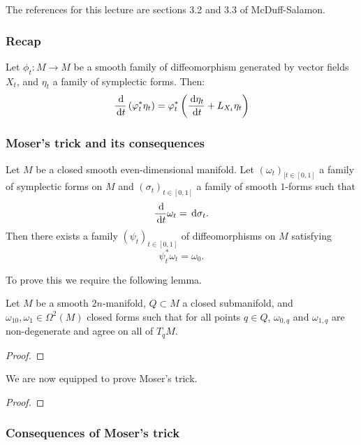 The references for this lecture are sections 3.2 and 3.3 of McDuff-Salamon.
\subsubsection*{Recap}


\begin{thm*}
    Let $\phi_t:M\to M$ be a smooth family of diffeomorphism generated by vector fields $X_t$, and $\eta_t$ a family of symplectic forms.
    Then:
    \[\frac{\,\mathrm d}{\,\mathrm d t}\left(\varphi_t^*\eta_t\right)=\varphi_t^*\left(\frac{\,\mathrm d\eta_t}{\,\mathrm d t}+L_{X_t}\eta_t\right)\]
\end{thm*}

\subsubsection*{Moser's trick and its consequences}
\begin{thm}
    Let $M$ be a closed smooth even-dimensional manifold.
    Let $(\omega_t)_{[t\in[0,1]}$ a family of symplectic forms on $M$ and $(\sigma_t)_{t\in[0,1]}$ a family of smooth $1$-forms such that
    \[\frac{\,\mathrm d}{\,\mathrm d t}\omega_t=\,\mathrm d\sigma_t.\]
    Then there exists a family $(\psi_t)_{t\in[0,1]}$ of diffeomorphisms on $M$ satisfying
    \[\psi_t^*\omega_t=\omega_0.\]
\end{thm}

To prove this we require the following lemma.
\begin{lem}
    Let $M$ be a smooth $2n$-manifold, $Q\subset M$ a closed submanifold, and $\omega_10,\omega_1\in\Omega^2(M)$ closed forms such that for all points $q\in Q$, $\omega_{0,q}$ and $\omega_{1,q}$ are non-degenerate and agree on all of $T_qM$.
\end{lem}

\begin{proof}
\end{proof}

We are now equipped to prove Moser's trick.

\begin{proof}
\end{proof}

\subsubsection*{Consequences of Moser's trick}

